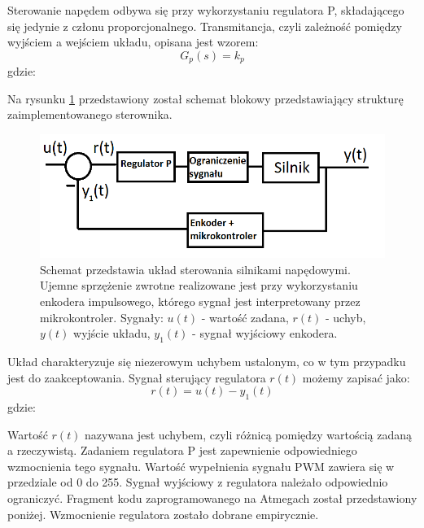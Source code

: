 Sterowanie napędem odbywa się przy wykorzystaniu regulatora P, składającego się jedynie z członu proporcjonalnego. Transmitancja, czyli zależność pomiędzy wyjściem a wejściem układu, opisana jest wzorem:
\begin{equation}
	G_{p}(s) =  k_p 
   \label{eq:reg}
 \end{equation}
 gdzie:  
 \begin{equationDescriptor}
 \end{equationDescriptor}
 \noindent
 Na rysunku \ref{schem_ster_2} przedstawiony został schemat blokowy przedstawiający strukturę zaimplementowanego sterownika.
   \begin{figure}[H]
    \begin{center}
      \includegraphics[scale=0.45]{imgs/sterowanie2.png}
 	\caption[Schemat zrealizowanego sterownika.]{\small{Schemat przedstawia układ sterowania silnikami napędowymi. Ujemne sprzężenie zwrotne realizowane jest przy wykorzystaniu enkodera impulsowego, którego sygnał jest interpretowany przez mikrokontroler. Sygnały: $u(t)$ - wartość zadana, $r(t)$ - uchyb, $y(t)$ wyjście układu, $y_1(t)$ - sygnał wyjściowy enkodera.}}
	\label{schem_ster_2}
    \end{center}
  \end{figure}  
Układ charakteryzuje się niezerowym uchybem ustalonym, co w tym przypadku jest do zaakceptowania. Sygnał sterujący regulatora $r(t)$ możemy zapisać jako:
\begin{equation}
	r(t)=u(t)-y_1(t)
   \label{eq:reg1}
 \end{equation}
 gdzie:  
 \begin{equationDescriptor}
 \end{equationDescriptor}
 \noindent
Wartość $r(t)$ nazywana jest uchybem, czyli różnicą pomiędzy wartością zadaną a rzeczywistą. Zadaniem regulatora P jest zapewnienie odpowiedniego wzmocnienia tego sygnału. Wartość wypełnienia sygnału PWM zawiera się w przedziale od 0 do 255. Sygnał wyjściowy z regulatora należało odpowiednio ograniczyć. Fragment kodu zaprogramowanego na Atmegach został przedstawiony poniżej. Wzmocnienie regulatora zostało dobrane empirycznie.

